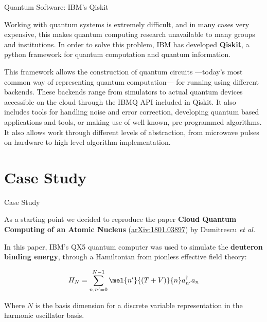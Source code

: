 \documentclass[9pt, handout, aspectratio=169]{beamer}		%
\begin{document}
	\begin{frame}{Quantum Software: IBM's Qiskit}
	
		Working with quantum systems is extremely difficult, and in many cases very expensive, this makes quantum computing research unavailable to many groups and institutions. In order to solve this problem, IBM has developed \textbf{Qiskit}, a python framework for quantum computation and quantum information.
		
		\medskip
		
		This framework allows the construction of quantum circuits ---today's most common way of representing quantum computation--- for running using different backends. These backends range from simulators to actual quantum devices accessible on the cloud through the IBMQ API included in Qiskit. It also includes tools for handling noise and error correction, developing quantum based applications and tools, or making use of well known, pre-programmed algorithms. It also allows work through different levels of abstraction, from microwave pulses on hardware to high level algorithm implementation.
		
	\end{frame}
	

\section{Case Study}
	
	\begin{frame}{Case Study}
		
		As a starting point we decided to reproduce the paper \textbf{Cloud Quantum Computing of an Atomic Nucleus} (\href{https://arxiv.org/abs/1801.03897}{arXiv:1801.03897}) by Dumitrescu \textit{et al.} 
		
		\medskip
		
		In this paper, IBM's QX5 quantum computer was used to simulate the \textbf{deuteron binding energy}, through a Hamiltonian from pionless effective field theory:
		
		\begin{align*}
			H_N = \sum^{N-1}_{n,n'=0} \mel{n'}{(T+V)}{n}a^{\dagger}_{n'}a_{n}
		\end{align*}
		
		Where $N$ is the basis dimension for a discrete variable representation in the harmonic oscillator basis.
		
	\end{frame}
	
\end{document}
